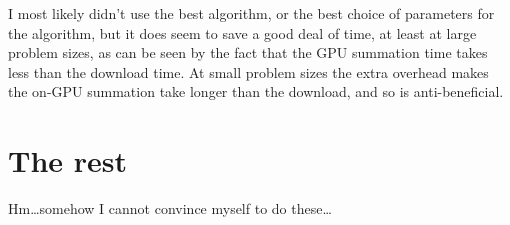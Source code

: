 \documentclass[11pt]{article}
\begin{document}
I most likely didn't use the best algorithm, or the best choice of parameters
for the algorithm, but it does seem to save a good deal of time, at least at
large problem sizes, as can be seen by the fact that the GPU summation time
takes less than the download time. At small problem sizes the extra overhead
makes the on-GPU summation take longer than the download, and so is
anti-beneficial.



\section{The rest}

Hm\ldots somehow I cannot convince myself to do these\ldots
\end{document}
